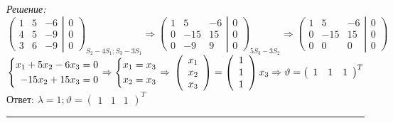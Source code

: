 \documentclass[a4paper, 12pt]{article}
\newenvironment{solution}
    {\textit{Решение: }}
    {\noindent\rule{7in}{1.5pt}}
\begin{document}
\begin{solution}
\\
$\displaystyle
\left(\begin{array}{rrr}1 & 5 & -6 \\ 4 & 5 & -9 \\ 3 & 6 & -9 \end{array}\right|\left.\begin{array}{rrr}0\\0 \\0 \end{array}\right)_{S_2-4S_1;S_3-3S_1}\Rightarrow\left(\begin{array}{rrr}1 & 5 & -6 \\ 0 & -15 & 15 \\ 0 & -9 & 9 \end{array}\right|\left.\begin{array}{rrr}0\\0 \\0 \end{array}\right)_{5S_3-3S_2}\Rightarrow\left(\begin{array}{rrr}1 & 5 & -6 \\ 0 & -15 & 15 \\ 0 & 0 & 0 \end{array}\right|\left.\begin{array}{rrr}0\\0 \\0 \end{array}\right)
$
\\
$\displaystyle
\left\{
\begin{aligned}
x_1+5x_2-6x_3=0 \\
-15x_2+15x_3=0 
\end{aligned}
\right.
\Rightarrow
\left\{
\begin{aligned}
x_1=x_3 \\
x_2=x_3 
\end{aligned}
\right.
\Rightarrow
\\
\left(\begin{array}{r}x_1\\x_2\\x_3\end{array}\right)=\left(\begin{array}{r}1\\1\\1\end{array}\right)x_3
\Rightarrow
\vartheta=\left(\begin{array}{rrr}1 & 1 & 1\end{array}\right)^{T}
$
\\
Ответ: $\displaystyle \lambda=1;\vartheta=\left(\begin{array}{rrr}1 & 1 & 1\end{array}\right)^{T}$

\end{solution}
\end{document}
